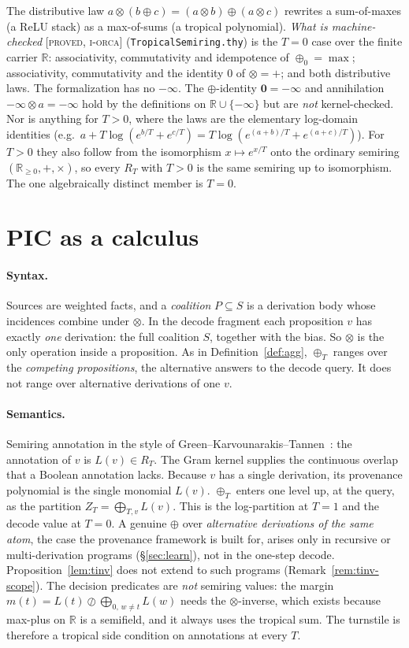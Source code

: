 \documentclass[11pt]{article}
\theoremstyle{definition}
\theoremstyle{plain}
\theoremstyle{remark}
\newcommand{\proved}{\textsc{[proved, i-orca]}}
\newcommand{\RR}{\mathbb{R}}
\begin{document}
\noindent The distributive law $a\otimes(b\oplus c)=(a\otimes b)\oplus(a\otimes c)$ rewrites a
sum-of-maxes (a ReLU stack) as a max-of-sums (a tropical polynomial). \emph{What is machine-checked}
\proved{} (\texttt{TropicalSemiring.thy}) is the $T=0$ case over the finite carrier $\RR$:
associativity, commutativity and idempotence of $\oplus_0=\max$; associativity, commutativity and the
identity $0$ of $\otimes=+$; and both distributive laws. The formalization has no $-\infty$. The
$\oplus$-identity $\mathbf{0}=-\infty$ and annihilation $-\infty\otimes a=-\infty$ hold by the
definitions on $\RR\cup\{-\infty\}$ but are \emph{not} kernel-checked. Nor is anything for $T>0$, where
the laws are the elementary log-domain identities (e.g.\
$a+T\log(e^{b/T}+e^{c/T})=T\log(e^{(a+b)/T}+e^{(a+c)/T})$). For $T>0$ they also follow from the
isomorphism $x\mapsto e^{x/T}$ onto the ordinary semiring $(\RR_{\ge0},+,\times)$, so every
$R_T$ with $T>0$ is the same semiring up to isomorphism. The one algebraically distinct member is $T=0$.

\section{PIC as a calculus}\label{sec:calculus}

\paragraph{Syntax.} Sources are weighted facts, and a \emph{coalition} $P\subseteq S$ is a derivation
body whose incidences combine under $\otimes$. In the decode fragment each proposition $v$ has exactly
\emph{one} derivation: the full coalition $S$, together with the bias. So $\otimes$ is the only operation
inside a proposition. As in Definition~\ref{def:agg}, $\oplus_T$ ranges over the \emph{competing
propositions}, the alternative answers to the decode query. It does not range over alternative derivations of
one $v$.

\paragraph{Semantics.} Semiring annotation in the style of Green--Karvounarakis--Tannen~\cite{green2007provenance}: the annotation of
$v$ is $L(v)\in R_T$. The Gram kernel supplies the continuous overlap that a Boolean annotation lacks.
Because $v$ has a single derivation, its provenance polynomial is the single monomial $L(v)$. $\oplus_T$
enters one level up, at the query, as the partition $Z_T=\bigoplus_{T,v}L(v)$. This is the log-partition
at $T=1$ and the decode value at $T=0$. A genuine $\oplus$ over \emph{alternative derivations of the same
atom}, the case the provenance framework is built for, arises only in recursive or multi-derivation
programs (\S\ref{sec:learn}), not in the one-step decode. Proposition~\ref{lem:tinv} does not extend to
such programs (Remark~\ref{rem:tinv-scope}). The decision predicates are
\emph{not} semiring values: the margin $m(t)=L(t)\oslash\bigoplus_{0,\,w\neq t}L(w)$ needs the
$\otimes$-inverse, which exists because max-plus on $\RR$ is a semifield, and it always uses the
tropical sum. The turnstile is therefore a tropical side condition on annotations at every $T$.
\end{document}
